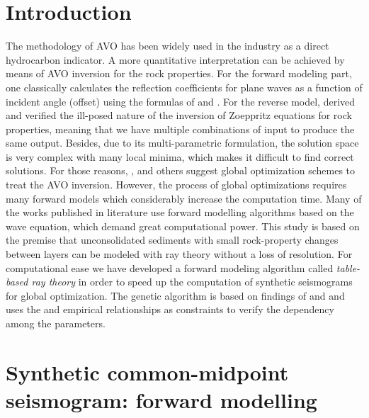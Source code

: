 \documentclass{vie16}
\begin{document}
\section{Introduction}
The methodology of AVO has been widely used in the industry
as a direct hydrocarbon indicator. A more quantitative
interpretation can be achieved by means of AVO inversion for
the rock properties. For the forward modeling part, one
classically calculates the reflection coefficients for plane
waves as a function of incident angle (offset) using the
formulas of \cite{Knott1899} and \cite{Zoeppritz1919}. For
the reverse model, \cite{Rosa1976} derived and verified the
ill-posed nature of the inversion of Zoeppritz equations for
rock properties, meaning that we have multiple combinations
of input to produce the same output. Besides, due to its
multi-parametric formulation, the solution space is very
complex with many local minima, which makes it difficult to
find correct solutions. For those reasons,
\cite{Stoffa1991}, \cite{Mallick1995} and others suggest
global optimization schemes to treat the AVO
inversion. However, the process of global optimizations
requires many forward models which considerably increase the
computation time. Many of the works published in literature
use forward modelling algorithms based on the wave equation,
which demand great computational power. This study is based
on the premise that unconsolidated sediments with small
rock-property changes between layers can be modeled with ray
theory without a loss of resolution. For computational ease
we have developed a forward modeling algorithm called
\textit{table-based ray theory} in order to speed up the
computation of synthetic seismograms for global
optimization.  The genetic algorithm is based on findings of
\cite{Stoffa1991} and \cite{Sen1992} and uses the
\cite{Gardner1974} and \cite{Castagna1985} empirical
relationships as constraints to verify the dependency among
the parameters.

\section{Synthetic common-midpoint seismogram: forward
modelling} 
\end{document}
